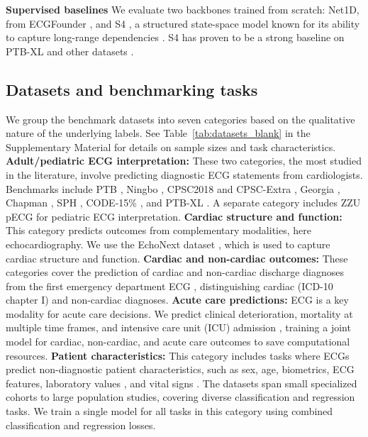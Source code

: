 \documentclass{article}
\newcommand{\heading}[1]{\noindent\textbf{#1}}
\begin{document}
        \heading{Supervised baselines} We evaluate two backbones trained from scratch: Net1D, from ECGFounder \citep{doi:10.1056/AIoa2401033}, and S4 \citep{mehari2023towards}, a structured state-space model known for its ability to capture long-range dependencies \citep{gu2022efficiently}. S4 has proven to be a strong baseline on PTB-XL and other datasets \citep{mehari2023towards,Strodthoff2024}.


        \subsection{Datasets and benchmarking tasks}
        We group the benchmark datasets into seven categories based on the qualitative nature of the underlying labels. See Table~\ref{tab:datasets_blank} in the Supplementary Material for details on sample sizes and task characteristics. \textbf{Adult/pediatric ECG interpretation:} These two categories, the most studied in the literature, involve predicting diagnostic ECG statements from cardiologists. Benchmarks include PTB \citep{bousseljot1995cardiodat}, Ningbo \citep{reyna2022physionet}, CPSC2018 and CPSC-Extra \citep{reyna2021cinc,reyna2022physionet}, Georgia \citep{reyna2021cinc,reyna2022physionet}, Chapman \citep{reyna2021cinc,reyna2022physionet}, SPH \citep{liu2022large,liu_wang_chen_zhang_li_bian_shu_chen_2022}, CODE-15\% \citep{ribeiro2021code15}, and PTB-XL \citep{wagner2022ptbxl,wagner2020ptb}. A separate category includes ZZU pECG \citep{tan2025pediatric,jian2025} for pediatric ECG interpretation. \textbf{Cardiac structure and function:} This category predicts outcomes from complementary modalities, here echocardiography. We use the EchoNext dataset \citep{elias2025echonext}, which is used to capture cardiac structure and function. \textbf{Cardiac and non-cardiac outcomes:} These categories cover the prediction of cardiac and non-cardiac discharge diagnoses from the first emergency department ECG \citep{Strodthoff2024}, distinguishing cardiac (ICD-10 chapter I) and non-cardiac diagnoses. \textbf{Acute care predictions:} ECG is a key modality for acute care decisions. We predict clinical deterioration, mortality at multiple time frames, and intensive care unit (ICU) admission \citep{Alcaraz2025mdsed}, training a joint model for cardiac, non-cardiac, and acute care outcomes to save computational resources. \textbf{Patient characteristics:} This category includes tasks where ECGs predict non-diagnostic patient characteristics, such as sex, age, biometrics, ECG features, laboratory values \citep{alcaraz2024cardiolablaboratoryvaluesestimation}, and vital signs \citep{gow2023mimicivecg}. The datasets span small specialized cohorts to large population studies, covering diverse classification and regression tasks. We train a single model for all tasks in this category using combined classification and regression losses.
\end{document}
